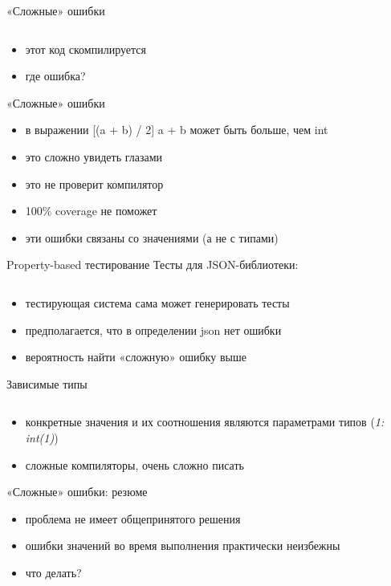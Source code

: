 \documentclass[10pt]{beamer}
\newcommand{\code}[4]{\inputminted[linenos, frame=none, firstline=#2, lastline=#3,
  framesep=10pt, bgcolor=lightgray]{#4}{#1}}
\begin{document}
\begin{frame}{«Сложные» ошибки}
  \code{code.java}{9}{15}{java}
  \begin{itemize}
  \item этот код скомпилируется
  \item где ошибка?
  \end{itemize}
\end{frame}

\begin{frame}{«Сложные» ошибки}
  \begin{itemize}
  \item в выражении [(a + b) / 2] a + b может быть больше, чем int
  \item это сложно увидеть глазами
  \item это не проверит компилятор
  \item 100\% coverage не поможет
  \item эти ошибки связаны со значениями (а не с типами)
  \end{itemize}
\end{frame}

\begin{frame}{Property-based тестирование}
  Тесты для JSON-библиотеки:
  \code{code.erl}{13}{15}{erlang}
  \begin{itemize}
  \item тестирующая система сама может генерировать тесты
  \item предполагается, что в определении json нет ошибки
  \item вероятность найти «сложную» ошибку выше
  \end{itemize}
\end{frame}

\begin{frame}{Зависимые типы}
  \code{code.ats}{1}{3}{c}
  \begin{itemize}
  \item конкретные значения и их соотношения являются параметрами типов (\emph{1: int(1)})
  \item сложные компиляторы, очень сложно писать
  \end{itemize}
\end{frame}

\begin{frame}{«Сложные» ошибки: резюме}
  \begin{itemize}
  \item проблема не имеет общепринятого решения
  \item ошибки значений во время выполнения практически неизбежны
  \item что делать?
  \end{itemize}
\end{frame}
\end{document}
